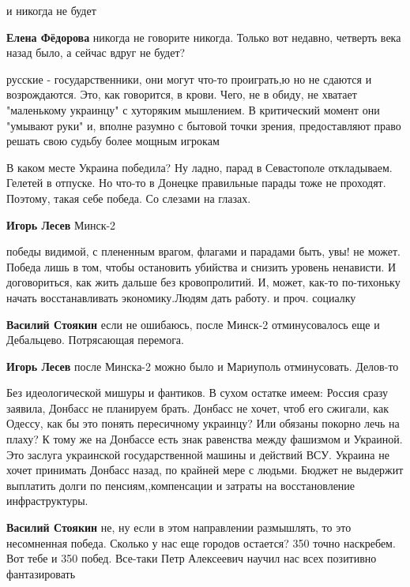 \begin{itemize}
\begin{itemize} %
и никогда не будет

\textbf{Елена Фёдорова} никогда не говорите никогда. Только вот недавно, четверть века назад было, а сейчас вдруг не будет?


русские - государственники, они могут что-то проиграть,ю но не сдаются и
возрождаются. Это, как говорится, в крови. Чего, не в обиду, не хватает
"маленькому украинцу" с хуторяким мышлением. В критический момент они "умывают
руки" и, вполне разумно с бытовой точки зрения, предоставляют право решать свою
судьбу более мощным игрокам


В каком месте Украина победила? Ну ладно, парад в Севастополе откладываем.
Гелетей в отпуске. Но что-то в Донецке правильные парады тоже не проходят.
Поэтому, такая себе победа. Со слезами на глазах.


\textbf{Игорь Лесев} Минск-2


победы видимой, с плененным врагом, флагами и парадами быть, увы! не может.
Победа лишь в том, чтобы остановить убийства и снизить уровень ненависти. И
договориться, как жить дальше без кровопролитий. И, может, как-то по-тихоньку
начать восстанавливать экономику.Людям дать работу. и проч. социалку

\textbf{Василий Стоякин} если не ошибаюсь, после Минск-2 отминусовалось еще и Дебальцево. Потрясающая перемога.

\textbf{Игорь Лесев} после Минска-2 можно было и Мариуполь отминусовать. Делов-то


Без идеологической мишуры и фантиков. В сухом остатке имеем: Россия сразу
заявила, Донбасс не планируем брать. Донбасс не хочет, чтоб его сжигали, как
Одессу, как бы это понять пересичному украинцу? Или обязаны покорно лечь на
плаху? К тому же на Донбассе есть знак равенства между фашизмом и Украиной. Это
заслуга украинской государственной машины и действий ВСУ. Украина не хочет
принимать Донбасс назад, по крайней мере с людьми. Бюджет не выдержит выплатить
долги по пенсиям,,компенсации и затраты на восстановление инфраструктуры.

\textbf{Василий Стоякин} не, ну если в этом направлении размышлять, то это несомненная победа. Сколько у нас еще городов остается? 350 точно наскребем. Вот тебе и 350 побед. Все-таки Петр Алексеевич научил нас всех позитивно фантазировать


\end{itemize}
\end{itemize}
